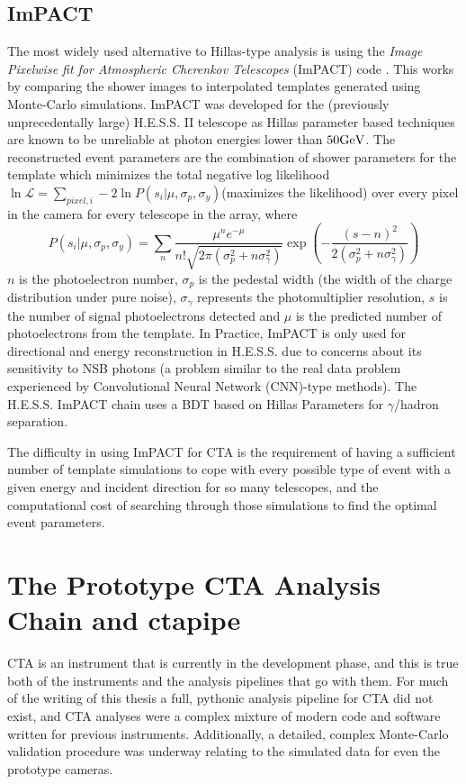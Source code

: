\subsection{ImPACT}
The most widely used alternative to Hillas-type analysis is using the \textit{Image Pixelwise fit for Atmospheric Cherenkov Telescopes} (ImPACT) code \cite{impact}. This works by comparing the shower images to interpolated templates generated using Monte-Carlo simulations. ImPACT was developed for the (previously unprecedentally large) H.E.S.S. II telescope as Hillas parameter based techniques are known to be unreliable at photon energies lower than $50\rm{Ge}V$.  The reconstructed event parameters are the combination of shower parameters for the template which minimizes the total negative log likelihood $\ln\mathcal{L}=\sum_{pixel,i}-2\ln{P(s_i|\mu,\sigma_p,\sigma_y)}$(maximizes the likelihood) over every pixel in the camera for every telescope in the array, where
\begin{equation}
P(s_i|\mu,\sigma_p,\sigma_y)=\sum_n \frac{\mu^n e^{-\mu}}{n!\sqrt{2\pi (\sigma_p^2+n\sigma_{\gamma}^2)}} \exp \left(-\frac{(s-n)^2}{2(\sigma_p^2 + n \sigma_{\gamma}^2)} \right)
\end{equation}
$n$ is the photoelectron number, $\sigma_p$ is the pedestal width (the width of the charge distribution under pure noise), $\sigma_{\gamma}$ represents the photomultiplier resolution, $s$ is the number of signal photoelectrons detected and $\mu$ is the predicted number of photoelectrons from the template. In Practice, ImPACT is only used for directional and energy reconstruction in H.E.S.S. due to concerns about its sensitivity to NSB photons (a problem similar to the real data problem experienced by Convolutional Neural Network (CNN)-type methods). The H.E.S.S. ImPACT chain uses a BDT based on Hillas Parameters for $\gamma$/hadron separation.

The difficulty in using ImPACT for CTA is the requirement of having a sufficient number of template simulations to cope with every possible type of event with a given energy and incident direction for so many telescopes, and the computational cost of searching through those simulations to find the optimal event parameters.

\section{The Prototype CTA Analysis Chain and ctapipe}

CTA is an instrument that is currently in the development phase, and this is true both of the instruments and the analysis pipelines that go with them. For much of the writing of this thesis a full, pythonic analysis pipeline for CTA did not exist, and CTA analyses were a complex mixture of modern code and software written for previous instruments. Additionally, a detailed, complex Monte-Carlo validation procedure was underway relating to the simulated data for even the prototype cameras.

